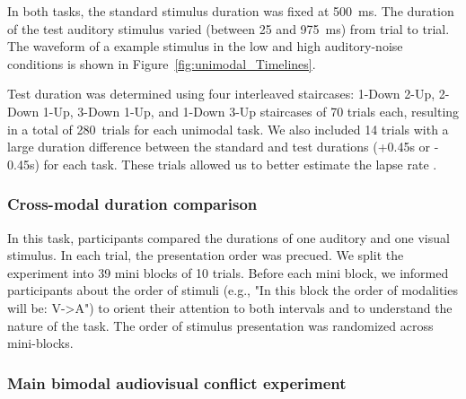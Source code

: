 \documentclass[9pt,lineno,doublespacing]{elife}
\begin{document}
In both tasks, the standard stimulus duration was fixed at 500~ms. The duration of the test auditory stimulus varied (between 25 and 975~ms) from trial to trial. The waveform of a example stimulus in the low and high auditory-noise conditions is shown in Figure~\ref{fig:unimodal_Timelines}.

Test duration was determined  using four interleaved staircases: 1-Down 2-Up, 2-Down 1-Up, 3-Down 1-Up, and 1-Down 3-Up staircases of 70 trials each, resulting in a total of 280~trials for each unimodal task. We also included 14 trials with a large duration difference between the standard and test durations (+0.45s or - 0.45s) for each task. These trials allowed us to better estimate the lapse rate \citep{prins2012psychometric}.


\subsubsection{Cross-modal duration comparison}
In this task, participants compared the durations of one auditory and one visual stimulus. In each trial, the presentation order was precued. We split the experiment into 39 mini blocks of 10 trials. Before each mini block, we informed participants about the order of stimuli (e.g., "In this block the order of modalities will be: V->A") to orient their attention to both intervals and to understand the nature of the task. The order of stimulus presentation was randomized across mini-blocks.


\subsubsection{Main bimodal audiovisual conflict experiment}
\end{document}
